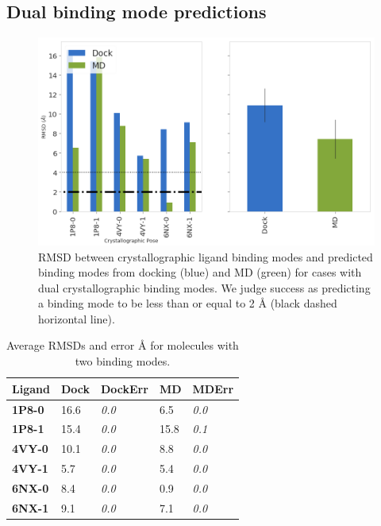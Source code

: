 \subsection{Dual binding mode predictions}
\begin{figure}
    \centering
    \includegraphics[width=\linewidth]{chapter5/Figures/cluster3_seh_dualbm.png}
    \caption[SEH MD Dual Binding Mode Ligands]{RMSD between crystallographic ligand binding modes and predicted binding modes from docking (blue) and MD (green) for cases with dual crystallographic binding modes. We judge success as predicting a binding mode to be less than or equal to 2 {\AA} (black dashed horizontal line). }
    \label{fig:rmsd-dualbm}
\end{figure}

\begin{table}[]
\begin{tabular}{|l|l|l|l|l|}
\hline
\textbf{Ligand} & \textbf{Dock} & \textbf{DockErr} & \textbf{MD} & \textbf{MDErr} \\ \hline
\textbf{1P8-0}  & 16.6          & \textit{0.0}     & 6.5         & \textit{0.0}   \\ \hline
\textbf{1P8-1}  & 15.4          & \textit{0.0}     & 15.8        & \textit{0.1}   \\ \hline
\textbf{4VY-0}  & 10.1          & \textit{0.0}     & 8.8         & \textit{0.0}   \\ \hline
\textbf{4VY-1}  & 5.7           & \textit{0.0}     & 5.4         & \textit{0.0}   \\ \hline
\textbf{6NX-0}  & 8.4           & \textit{0.0}     & 0.9         & \textit{0.0}   \\ \hline
\textbf{6NX-1}  & 9.1           & \textit{0.0}     & 7.1         & \textit{0.0}   \\ \hline
\end{tabular}
\caption{Average RMSDs and error {\AA} for molecules with two binding modes.}
\label{table:dualbm}
\end{table}


